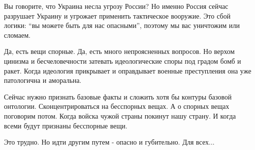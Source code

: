 Вы говорите, что Украина несла угрозу России? Но именно Россия сейчас разрушает
Украину и угрожает применить тактическое вооружие. Это сбой логики: \enquote{вы можете
быть для нас опасными}, поэтому мы вас уничтожим или сломаем. 

Да, есть вещи спорные. Да, есть много непроясненных вопросов. Но верхом цинизма
и бесчеловечности затевать идеологические  споры под градом бомб и ракет. Когда
идеология прикрывает и оправдывает военные преступления она уже патологична и
аморальна.

Сейчас нужно признать базовые факты и сложить хотя бы контуры базовой
онтологии. Сконцентрироваться на бесспорных вещах. А о спорных вещах поговорим
потом. Когда войска чужой страны покинут нашу страну. И когда всеми будут
признаны бесспорные вещи.

Это трудно. Но идти другим путем - опасно и губительно. Для всех...
